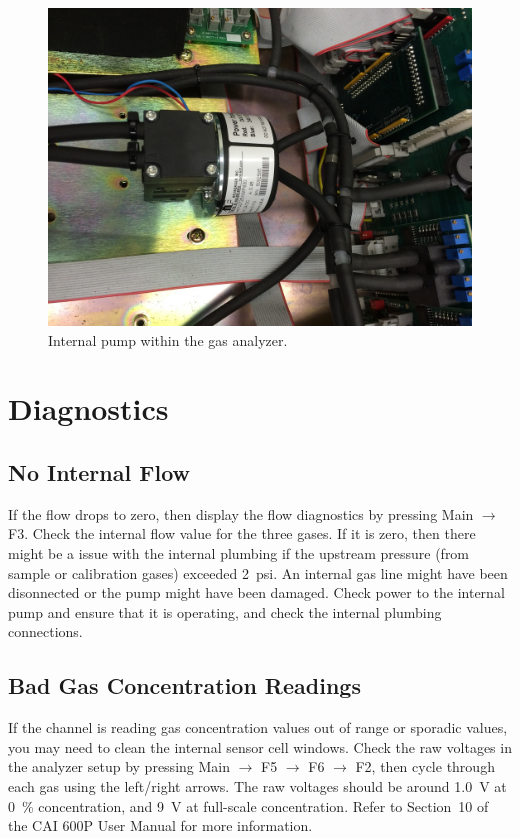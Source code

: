 \documentclass[11pt,oneside]{book}
\begin{document}
\begin{figure}[h!]
\includegraphics[width=5in]{../Equipment/Gas_Analyzer/Figures/gas_analyzer_3}
\caption{Internal pump within the gas analyzer.}
\label{fig:gas_analyzer_3}
\end{figure}

\section{Diagnostics}

\subsection{No Internal Flow}

If the flow drops to zero, then display the flow diagnostics by pressing Main $\rightarrow$ F3. Check the internal flow value for the three gases. If it is zero, then there might be a issue with the internal plumbing if the upstream pressure (from sample or calibration gases) exceeded 2~psi. An internal gas line might have been disonnected or the pump might have been damaged. Check power to the internal pump and ensure that it is operating, and check the internal plumbing connections.

\subsection{Bad Gas Concentration Readings}

If the channel is reading gas concentration values out of range or sporadic values, you may need to clean the internal sensor cell windows. Check the raw voltages in the analyzer setup by pressing Main $\rightarrow$ F5 $\rightarrow$ F6 $\rightarrow$ F2, then cycle through each gas using the left/right arrows. The raw voltages should be around 1.0~V at 0~\% concentration, and 9~V at full-scale concentration. Refer to Section~10 of the CAI 600P User Manual for more information.
\end{document}
